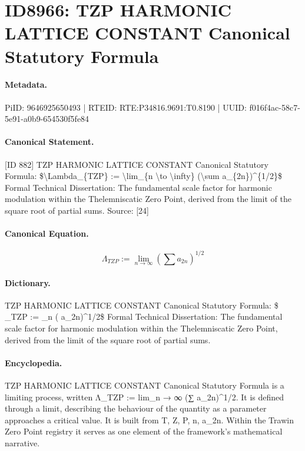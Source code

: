 \section*{ID8966: TZP HARMONIC LATTICE CONSTANT Canonical Statutory Formula}
\paragraph{Metadata.}
PiID: 9646925650493 | RTEID: RTE:P34816.9691:T0.8190 | UUID: f016f4ac-58c7-5e91-a0b9-654530f5fe84

\paragraph{Canonical Statement.}
[ID 882] TZP HARMONIC LATTICE CONSTANT Canonical Statutory Formula: \$\textbackslash{}Lambda\_\{TZP\} := \textbackslash{}lim\_\{n \textbackslash{}to \textbackslash{}infty\} (\textbackslash{}sum a\_\{2n\})\textasciicircum{}\{1/2\}\$ Formal Technical Dissertation: The fundamental scale factor for harmonic modulation within the Thelemniscatic Zero Point, derived from the limit of the square root of partial sums. Source: [24]

\paragraph{Canonical Equation.}
\[
\Lambda_{TZP} := \lim_{n \to \infty} (\sum a_{2n})^{1/2}
\]

\paragraph{Dictionary.}
TZP HARMONIC LATTICE CONSTANT Canonical Statutory Formula: \$ \_TZP := \_n ( a\_2n)\textasciicircum{}1/2\$ Formal Technical Dissertation: The fundamental scale factor for harmonic modulation within the Thelemniscatic Zero Point, derived from the limit of the square root of partial sums.

\paragraph{Encyclopedia.}
TZP HARMONIC LATTICE CONSTANT Canonical Statutory Formula is a limiting process, written Λ\_TZP := lim\_n → ∞ (∑ a\_2n)\textasciicircum{}1/2. It is defined through a limit, describing the behaviour of the quantity as a parameter approaches a critical value. It is built from T, Z, P, n, a\_2n. Within the Trawin Zero Point registry it serves as one element of the framework's mathematical narrative.
